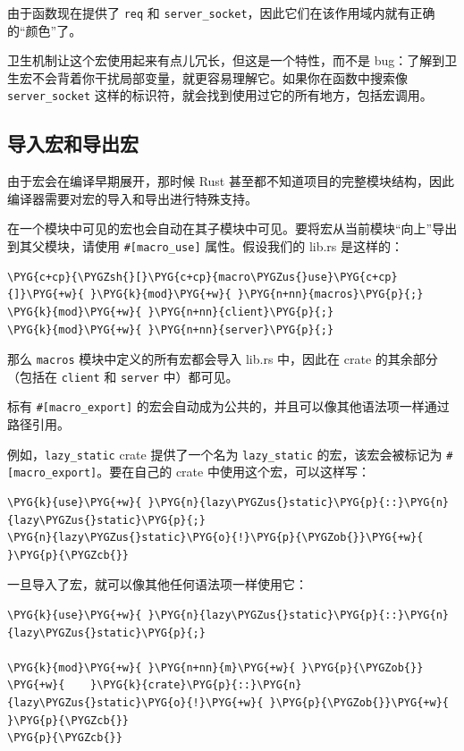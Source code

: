 由于函数现在提供了 \texttt{req} 和 \texttt{server\_socket}，因此它们在该作用域内就有正确的“颜色”了。

卫生机制让这个宏使用起来有点儿冗长，但这是一个特性，而不是 bug：了解到卫生宏不会背着你干扰局部变量，就更容易理解它。如果你在函数中搜索像 \texttt{server\_socket} 这样的标识符，就会找到使用过它的所有地方，包括宏调用。

\subsection{导入宏和导出宏}

由于宏会在编译早期展开，那时候 Rust 甚至都不知道项目的完整模块结构，因此编译器需要对宏的导入和导出进行特殊支持。

在一个模块中可见的宏也会自动在其子模块中可见。要将宏从当前模块“向上”导出到其父模块，请使用 \texttt{\#[macro\_use]} 属性。假设我们的 lib.rs 是这样的：

\begin{Verbatim}[commandchars=\\\{\},breaklines=true,breakanywhere=true,fontsize=\codefont,xleftmargin=17bp]
\PYG{c+cp}{\PYGZsh{}[}\PYG{c+cp}{macro\PYGZus{}use}\PYG{c+cp}{]}\PYG{+w}{ }\PYG{k}{mod}\PYG{+w}{ }\PYG{n+nn}{macros}\PYG{p}{;}
\PYG{k}{mod}\PYG{+w}{ }\PYG{n+nn}{client}\PYG{p}{;}
\PYG{k}{mod}\PYG{+w}{ }\PYG{n+nn}{server}\PYG{p}{;}
\end{Verbatim}

那么 \texttt{macros} 模块中定义的所有宏都会导入 lib.rs 中，因此在 crate 的其余部分（包括在 \texttt{client} 和 \texttt{server} 中）都可见。

标有 \texttt{\#[macro\_export]} 的宏会自动成为公共的，并且可以像其他语法项一样通过路径引用。

例如，\texttt{lazy\_static} crate 提供了一个名为 \texttt{lazy\_static} 的宏，该宏会被标记为 \texttt{\#[macro\_export]}。要在自己的 crate 中使用这个宏，可以这样写：

\begin{Verbatim}[commandchars=\\\{\},breaklines=true,breakanywhere=true,fontsize=\codefont,xleftmargin=17bp]
\PYG{k}{use}\PYG{+w}{ }\PYG{n}{lazy\PYGZus{}static}\PYG{p}{::}\PYG{n}{lazy\PYGZus{}static}\PYG{p}{;}
\PYG{n}{lazy\PYGZus{}static}\PYG{o}{!}\PYG{p}{\PYGZob{}}\PYG{+w}{ }\PYG{p}{\PYGZcb{}}
\end{Verbatim}

一旦导入了宏，就可以像其他任何语法项一样使用它：

\begin{Verbatim}[commandchars=\\\{\},breaklines=true,breakanywhere=true,fontsize=\codefont,xleftmargin=17bp]
\PYG{k}{use}\PYG{+w}{ }\PYG{n}{lazy\PYGZus{}static}\PYG{p}{::}\PYG{n}{lazy\PYGZus{}static}\PYG{p}{;}

\PYG{k}{mod}\PYG{+w}{ }\PYG{n+nn}{m}\PYG{+w}{ }\PYG{p}{\PYGZob{}}
\PYG{+w}{    }\PYG{k}{crate}\PYG{p}{::}\PYG{n}{lazy\PYGZus{}static}\PYG{o}{!}\PYG{+w}{ }\PYG{p}{\PYGZob{}}\PYG{+w}{ }\PYG{p}{\PYGZcb{}}
\PYG{p}{\PYGZcb{}}
\end{Verbatim}

